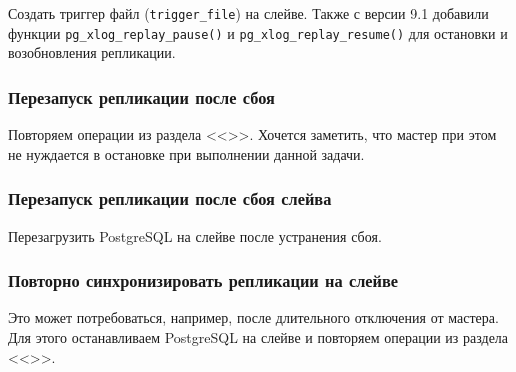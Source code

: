 Создать триггер файл (\lstinline!trigger_file!) на слейве. Также с версии 9.1 добавили функции \lstinline!pg_xlog_replay_pause()! и \lstinline!pg_xlog_replay_resume()! для остановки и возобновления репликации.

\subsubsection{Перезапуск репликации после сбоя}

Повторяем операции из раздела <<>>. Хочется заметить, что мастер при этом не нуждается в остановке при выполнении данной задачи.

\subsubsection{Перезапуск репликации после сбоя слейва}

Перезагрузить PostgreSQL на слейве после устранения сбоя.

\subsubsection{Повторно синхронизировать репликации на слейве}

Это может потребоваться, например, после длительного отключения от мастера. Для этого останавливаем PostgreSQL на слейве и повторяем операции из раздела <<>>.





